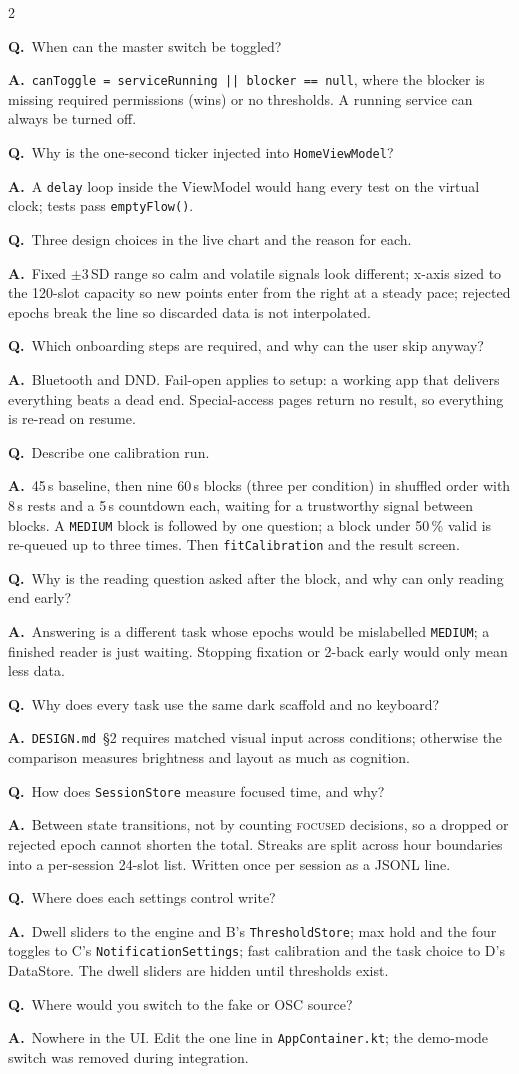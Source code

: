\documentclass[10pt,a4paper]{article}
\newcommand{\file}[1]{\texttt{\small #1}}          %
\newcommand{\code}[1]{\texttt{#1}}                  %
\newcommand{\state}[1]{\textsc{\small #1}}          %
\newcounter{qnum}
\newcommand{\Q}[2]{\stepcounter{qnum}\par\medskip\noindent
  \textbf{Q\theqnum.}\ #1\par\nobreak\smallskip\noindent
  {\color{teal}\textbf{A.}}\ #2\par}
\begin{document}
\begin{multicols}{2}
\Q{When can the master switch be toggled?}{\code{canToggle = serviceRunning || blocker == null},
where the blocker is missing required permissions (wins) or no thresholds. A running service can
always be turned off.}

\Q{Why is the one-second ticker injected into \code{HomeViewModel}?}{A \code{delay} loop inside
the ViewModel would hang every test on the virtual clock; tests pass \code{emptyFlow()}.}

\Q{Three design choices in the live chart and the reason for each.}{Fixed $\pm3$\,SD range so calm
and volatile signals look different; x-axis sized to the 120-slot capacity so new points enter from
the right at a steady pace; rejected epochs break the line so discarded data is not interpolated.}

\Q{Which onboarding steps are required, and why can the user skip anyway?}{Bluetooth and DND.
Fail-open applies to setup: a working app that delivers everything beats a dead end. Special-access
pages return no result, so everything is re-read on resume.}

\Q{Describe one calibration run.}{45\,s baseline, then nine 60\,s blocks (three per condition)
in shuffled order with 8\,s rests and a 5\,s countdown each, waiting for a trustworthy signal
between blocks. A \code{MEDIUM} block is followed by one question; a block under 50\,\% valid is
re-queued up to three times. Then \code{fitCalibration} and the result screen.}

\Q{Why is the reading question asked after the block, and why can only reading end early?}
{Answering is a different task whose epochs would be mislabelled \code{MEDIUM}; a finished reader
is just waiting. Stopping fixation or 2-back early would only mean less data.}

\Q{Why does every task use the same dark scaffold and no keyboard?}{\file{DESIGN.md}~\S2 requires
matched visual input across conditions; otherwise the comparison measures brightness and layout
as much as cognition.}

\Q{How does \code{SessionStore} measure focused time, and why?}{Between state transitions, not by
counting \state{focused} decisions, so a dropped or rejected epoch cannot shorten the total. Streaks
are split across hour boundaries into a per-session 24-slot list. Written once per session as a
JSONL line.}

\Q{Where does each settings control write?}{Dwell sliders to the engine and B's
\code{ThresholdStore}; max hold and the four toggles to C's \code{NotificationSettings}; fast
calibration and the task choice to D's DataStore. The dwell sliders are hidden until thresholds
exist.}

\Q{Where would you switch to the fake or OSC source?}{Nowhere in the UI. Edit the one line in
\file{AppContainer.kt}; the demo-mode switch was removed during integration.}
\end{multicols}
\end{document}
